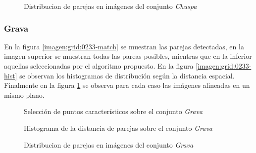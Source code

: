 \begin{figure}[h]
	\centering     %
	\hspace{1mm}%
	
	\caption[Distribucion de parejas en imágenes del conjunto \textit{Chuspa}]{Distribucion de parejas en imágenes del conjunto \textit{Chuspa}}
	\label{imagen:grid:0233-align}
\end{figure}


\subsubsection*{Grava}
En la figura \ref{imagen:grid:0233-match} se muestran las parejas detectadas, en la imagen superior se muestran todas las pareas posibles, mientras que en la inferior aquellas seleccionadas por el algoritmo propuesto. En la figura \ref{imagen:grid:0233-hist} se observan los histogramas de distribución según la distancia espacial. Finalmente en la figura \ref{imagen:grid:0233-align} se observa para cada caso las imágenes alineadas en un mismo plano.

\begin{figure}[h]
	\centering     %
	\hspace{1mm}%
	
	\caption[Selección de puntos caracteristicos sobre el conjunto \textit{Grava}]{Selección de puntos característicos sobre el conjunto \textit{Grava}}
	\label{imagen:grid:geo-match}
\end{figure}

\begin{figure}[h]
	\centering     %
	\hspace{3mm}%
	
	\caption[Histograma de la distancia de parejas sobre el conjunto \textit{Grava}]{Histograma de la distancia de parejas sobre el conjunto \textit{Grava}}
	\label{imagen:grid:geo-hist}
\end{figure}
\begin{figure}[h]
	\centering     %
	\hspace{1mm}%
	
	\caption[Distribucion de parejas en imágenes del conjunto \textit{Grava}]{Distribucion de parejas en imágenes del conjunto \textit{Grava}}
	\label{imagen:grid:geo-align}
\end{figure}



